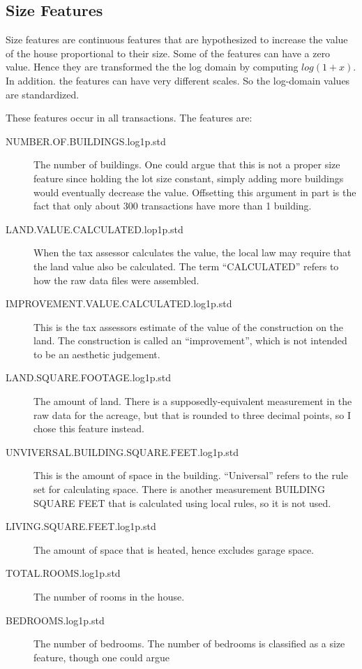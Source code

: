 \subsection{Size Features}

Size features are continuous features that are hypothesized to increase
the value of the house proportional to their size. Some of the
features can have a zero value. Hence they are transformed the the log
domain by computing $log(1 + x)$. In addition. the features can have
very different scales. So the log-domain values are standardized.

These features occur in all transactions. The features are:
\begin{description}
\item[NUMBER.OF.BUILDINGS.log1p.std] The number of buildings. One
  could argue that this is not a proper size feature since holding the
  lot size constant, simply adding more buildings would eventually
  decrease the value. Offsetting this argument in part is the fact
  that only about 300 transactions have more than 1 building.
\item[LAND.VALUE.CALCULATED.lop1p.std] When the tax assessor calculates
  the value, the local law may require that the land value also be
  calculated. The term ``CALCULATED''
  refers to how the raw data files were assembled.
\item[IMPROVEMENT.VALUE.CALCULATED.log1p.std] This is the tax
  assessors estimate of the value of the construction on the land. The
  construction is called an ``improvement'', which is not intended to
  be an aesthetic judgement.
\item[LAND.SQUARE.FOOTAGE.log1p.std] The amount of land. There is a
  supposedly-equivalent measurement in the raw data for the acreage,
  but that is rounded to three decimal points, so I chose this feature
  instead.
\item[UNVIVERSAL.BUILDING.SQUARE.FEET.log1p.std] This is the amount of
  space in the building. ``Universal'' refers to the rule set for
  calculating space. There is another measurement BUILDING SQUARE FEET
  that is calculated using local rules, so it is not used.
\item[LIVING.SQUARE.FEET.log1p.std] The amount of space that is
  heated, hence excludes garage space.
\item[TOTAL.ROOMS.log1p.std] The number of rooms in the house.
\item[BEDROOMS.log1p.std] The number of bedrooms. The number of
  bedrooms is classified as a size feature, though one could argue

\end{description}
